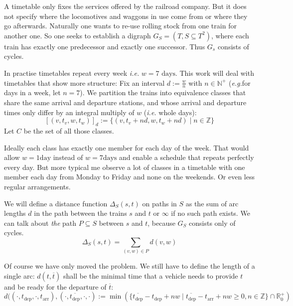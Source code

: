 \documentclass{amsart} %
\def\ie{\emph{i.e.}}
\def\eg{\emph{e.g.}}
\newcommand{\ol}[1]{\overline{#1}}
\begin{document}
A timetable only fixes the services offered by the railroad company.
But it does not specify where the locomotives and waggons in use come
from or where they go afterwards.  Naturally one wants to re-use
rolling stock from one train for another one.  So one seeks to
establish a digraph \(G_S=(T,S\subseteq T^2)\), where each train has
exactly one predecessor and exactly one successor.  Thus \(G_s\)
consists of cycles.


In practise timetables repeat every week \ie{} \(w = 7 \textrm{ days}\).
This work will deal with timetables that show more structure: Fix an
interval \(d := \frac{w}{n}\) with \(n \in \mathbb{N}^+\) (\eg for
days in a week, let \(n=7\)).  We partition the trains into
equivalence classes that share the same arrival and departure
stations, and whose arrival and departure times only differ by an
integral multiply of \(w\) (\ie{} whole days):
\begin{equation}
  \left[\left( v, t_v, w, t_w \right) \right]_d := \{(v, t_v+n d, w, t_w +n d) \mid n \in \mathbb{Z}\}
\end{equation}
Let \(C\) be the set of all those classes.

Ideally each class has exactly one member for each day of the week.
That would allow \(w = 1 \textrm{day}\) instead of \(w = 7 \textrm{days}\)
and enable a schedule that repeats perfectly every day.  But more
typical me observe a lot of classes in a timetable with one member
each day from Monday to Friday and none on the weekends.  Or even less
regular arrangements.

We will define a distance function \(\Delta_S (s,t)\) on paths in
\(S\) as the sum of arc lengths \(d\) in the path between the
trains \(s\) and \(t\) or \(\infty\) if no such path exists.  We can
talk about \emph{the} path \(P \subseteq S\) between \(s\) and \(t\),
because \(G_S\) consists only of cycles.
\[\Delta_S (s,t) = \sum_{(v,w)\in P} d(v,w)\]



Of course we have only moved the problem.  We still have to define the length of a single arc:  \(d(t, \ol{t})\) shall be the minimal time that a vehicle needs to provide \(t\) and be ready for the departure of \(\ol{t}\):
\[
d ((\cdot, t_{\textrm{dep}}, \cdot, t_{\textrm{arr}}), (\cdot, \ol{t_{\textrm{dep}}},\cdot, \cdot)  :=
\min (\{\ol{t_{\textrm{dep}}} - t_{\textrm{dep}} + n w \mid \ol{t_{\textrm{dep}}} - t_{\textrm{arr}} + nw \geq 0, n \in \mathbb{Z}\} \cap \mathbb{R}^+_0)
\]
\end{document}
